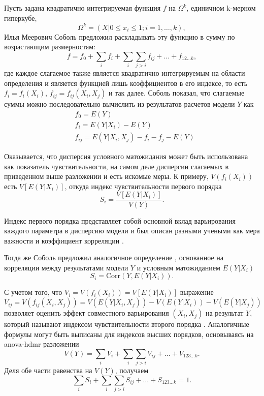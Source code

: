 \documentclass[a4paper,12pt]{article} %
\begin{document}
Пусть задана квадратично интегрируемая функция $f$ на $\Omega^k$, единичном k-мерном гиперкубе,
\begin{displaymath}
\Omega^k=(X|0\leq x_i \leq 1;i=1,\ldots ,k),
\end{displaymath}
Илья Меерович Соболь предложил раскладывать эту функцию в сумму по возрастающим размерностям:
\begin{displaymath}
f=f_0+\sum\limits_i f_i + \sum\limits_i \sum\limits_{j>i} f_{ij}+\ldots+f_{12\ldots k},
\end{displaymath}
где каждое слагаемое также является квадратично интегрируемым на области определения и является функцией лишь коэффициентов в его индексе, то есть $f_i=f_i(X_i)$, $f_{ij}=f_{ij}(X_i,X_j)$ и так далее. Соболь показал, что слагаемые суммы можно последовательно вычислить из результатов расчетов модели $Y$ как
\begin{align*}
&f_0=E(Y) \\
&f_i=E(Y|X_i)-E(Y) \\
&f_{ij} = E(Y|X_i,X_j)-f_i-f_j-E(Y)
\end{align*}

Оказывается, что дисперсия условного матожидания может быть использована как показатель чувствительности, на самом деле дисперсии слагаемых в приведенном выше разложении и есть искомые меры. К примеру, $V(f_i(X_i))$ есть $V[E(Y|X_i)]$, откуда индекс чувствительности первого порядка 
\begin{displaymath}
S_i=\frac{V[E(Y|X_i)]}{V(Y)}.
\end{displaymath}

Индекс первого порядка представляет собой основной вклад варьирования каждого параметра в дисперсию модели и был описан разными учеными как мера важности \cite{hora1986comparison, ishigami1990importance, iman1990robust, saltelli1993sensitivity, homma1996importance} и коэффициент корреляции \cite{mckay1996variance}.

Тогда же Соболь предложил аналогичное определение \cite{sobol1996freezing}, основанное на корреляции между результатами модели $Y$ и условным матожиданием $E(Y|X_i)$
\begin{displaymath}
S_i=\text{Corr}(Y,E(Y|X_i)).
\end{displaymath}

С учетом того, что $V_i=V(f_i(X_i))=V[E(Y|X_i)]$ выражение
\begin{displaymath}
V_{ij}=V(f_{ij}(X_i,X_j))=V(E(Y|X_i,X_j))-V(E(Y|X_i))-V(E(Y|X_j))
\end{displaymath}
позволяет оценить эффект совместного варьирования $(X_i,X_j)$ на результат $Y$, который называют индексом чувствительности второго порядка \cite{box1978statistics}. Аналогичные формулы могут быть выписаны для индексов высших порядков, основываясь на \gls{anova-hdmr} разложении
\begin{displaymath}
V(Y)=\sum\limits_i V_i + \sum\limits_i \sum\limits_{j>i} V_{ij}+\ldots +V_{123\ldots k}.
\end{displaymath}
Деля обе части равенства на $V(Y)$, получаем
\begin{displaymath}
\sum\limits_i S_i + \sum\limits_i \sum\limits_{j>i} S_{ij}+\ldots +S_{123\ldots k}=1.
\end{displaymath}
\end{document}

